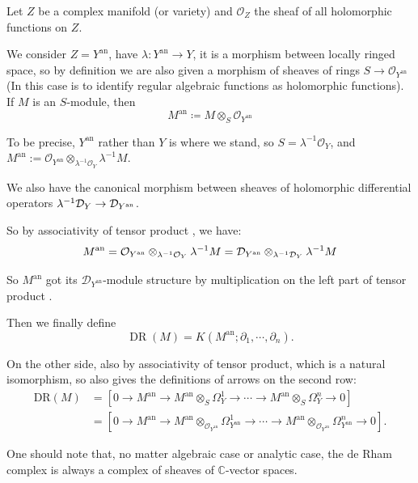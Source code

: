 Let $Z$ be a complex manifold (or variety) and $\mathcal{O}_{Z}$ the sheaf of all holomorphic functions on $Z$.

We consider $Z=Y^{\mathrm{an}}$, have $\lambda:Y^{\mathrm{an}}\rightarrow Y$, it is a morphism between locally ringed space, so by definition we are also given a morphism of sheaves of rings $S \longrightarrow \mathcal{O}_{Y^{\mathrm{an}}}$ (In this case is to identify regular algebraic functions as holomorphic functions). If $M$ is an $S$-module, then $$
    M^{\mathrm{an}} \coloneqq M \otimes_S \mathcal{O}_{Y^{\mathrm{an}}}$$

To be precise, $Y^{\mathrm{an}}$ rather than $Y$ is where we stand, so $S = \lambda^{-1}\mathcal{O}_{Y}$, and $M^{\mathrm{an}} := \mathcal{O}_{Y^{\mathrm{an}}} \otimes_{\lambda^{-1}\mathcal{O}_Y} \lambda^{-1}M$.

We also have the canonical morphism between sheaves of holomorphic differential operators $\lambda^{-1}\mathcal{D}_{Y} \to \mathcal{D}_{Y^{\mathrm{an}}}$.

So by associativity of tensor product \cite[Prop.~6.5.12.]{li2019algebraic}, we have:
$$M^{\mathrm{an}} = \mathcal{O}_{Y^{\mathrm{an}}} \otimes_{\lambda^{-1}\mathcal{O}_Y} \lambda^{-1}M = \mathcal{D}_{Y^{\mathrm{an}}} \otimes_{\lambda^{-1}\mathcal{D}_Y} \lambda^{-1}M$$

So $M^{\mathrm{an}}$ got its $\mathcal{D}_{Y^{\mathrm{an}}}$-module structure by multiplication on the left part of tensor product \cite[Chap.~4.7.]{hotta2008d}.

Then we finally define
$$
    \operatorname{DR}(M) = K(M^{\mathrm{an}}; \partial_1, \cdots, \partial_n).
$$

On the other side, also by associativity of tensor product, which is a natural isomorphism, so also gives the definitions of arrows on the second row:
\begin{align*}
    \mathrm{DR}(M) & = \left[0 \to M^{\mathrm{an}} \to M^{\mathrm{an}} \otimes_S \Omega_Y^1 \to \cdots \to M^{\mathrm{an}} \otimes_S \Omega_Y^n \to 0\right]                                                                                              \\
                   & = \left[0 \to M^{\mathrm{an}} \to M^{\mathrm{an}} \otimes_{\mathcal{O}_{Y^{\mathrm{an}}}} \Omega_{Y^{\mathrm{an}}}^1 \to \cdots \to M^{\mathrm{an}} \otimes_{\mathcal{O}_{Y^{\mathrm{an}}}} \Omega_{Y^{\mathrm{an}}}^n \to 0\right].
\end{align*}

One should note that, no matter algebraic case or analytic case, the de Rham complex is always a complex of sheaves of $\mathbb{C}$-vector spaces.

